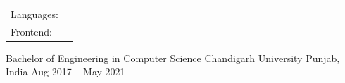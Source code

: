 \documentclass[]{awesome-cv}
\begin{document}
\begin{cventries}
	\cventry
	{}
	{\def\arraystretch{1.15}{\begin{tabular}{ l l }
		Languages:  & {\skill{ JavaScript (ES6+), TypeScript}} \\
		Frontend:  & {\skill{ React, Angular}} \\
		\end{tabular}}}
	{}
	{}
	{}
\end{cventries}

\vspace{-7mm}
\begin{cventries}
	\cventry
	{Bachelor of Engineering in Computer Science}
	{Chandigarh University}
	{Punjab, India}
	{Aug 2017 – May 2021}
	{}
\end{cventries}

\vspace{-2mm}

\ 
\end{document}
